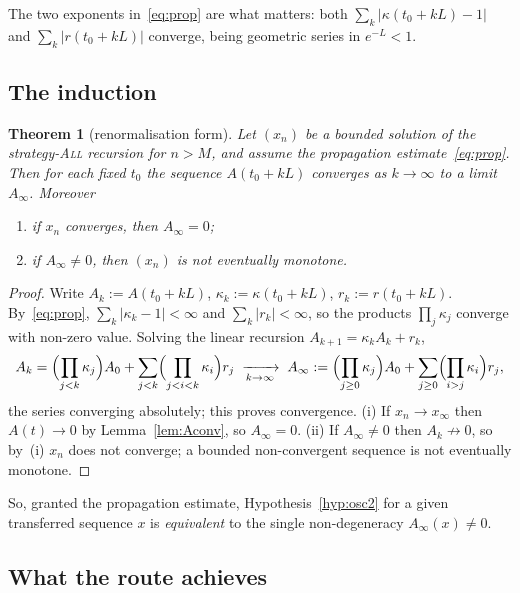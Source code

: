 \documentclass[11pt]{article}
\newtheorem{theorem}{Theorem}[section]
\theoremstyle{definition}
\newcommand{\All}{\textsc{All}}
\begin{document}
The two exponents in~\eqref{eq:prop} are what matters: both
$\sum_k|\kappa(t_0+kL)-1|$ and $\sum_k|r(t_0+kL)|$ converge, being
geometric series in $e^{-L}<1$.

\subsection{The induction}

\begin{theorem}[renormalisation form]\label{thm:renorm}
  Let $(x_n)$ be a bounded solution of the strategy-\All{} recursion
  for $n>M$, and assume the propagation estimate~\eqref{eq:prop}.
  Then for each fixed $t_0$ the sequence $A(t_0+kL)$ converges as
  $k\to\infty$ to a limit $A_\infty$. Moreover
  \begin{enumerate}[label=\rm(\roman*),leftmargin=2.4em]
  \item if $x_n$ converges, then $A_\infty=0$;
  \item if $A_\infty\ne0$, then $(x_n)$ is not eventually monotone.
  \end{enumerate}
\end{theorem}

\begin{proof}
  Write $A_k:=A(t_0+kL)$, $\kappa_k:=\kappa(t_0+kL)$,
  $r_k:=r(t_0+kL)$. By~\eqref{eq:prop}, $\sum_k|\kappa_k-1|<\infty$
  and $\sum_k|r_k|<\infty$, so the products
  $\prod_{j}\kappa_j$ converge with non-zero value. Solving the
  linear recursion $A_{k+1}=\kappa_kA_k+r_k$,
  \[
    A_k=\Bigl(\prod_{j<k}\kappa_j\Bigr)A_0
       +\sum_{j<k}\Bigl(\prod_{j<i<k}\kappa_i\Bigr)r_j
       \;\xrightarrow[k\to\infty]{}\;
       A_\infty:=\Bigl(\prod_{j\ge0}\kappa_j\Bigr)A_0
       +\sum_{j\ge0}\Bigl(\prod_{i>j}\kappa_i\Bigr)r_j,
  \]
  the series converging absolutely; this proves convergence.
  (i) If $x_n\to x_\infty$ then $A(t)\to0$ by
  Lemma~\ref{lem:Aconv}, so $A_\infty=0$. (ii) If $A_\infty\ne0$ then
  $A_k\not\to0$, so by~(i) $x_n$ does not converge; a bounded
  non-convergent sequence is not eventually monotone.
\end{proof}

So, granted the propagation estimate, Hypothesis~\ref{hyp:osc2} for a
given transferred sequence $x$ is \emph{equivalent} to the single
non-degeneracy $A_\infty(x)\ne0$.

\subsection{What the route achieves}
\end{document}
